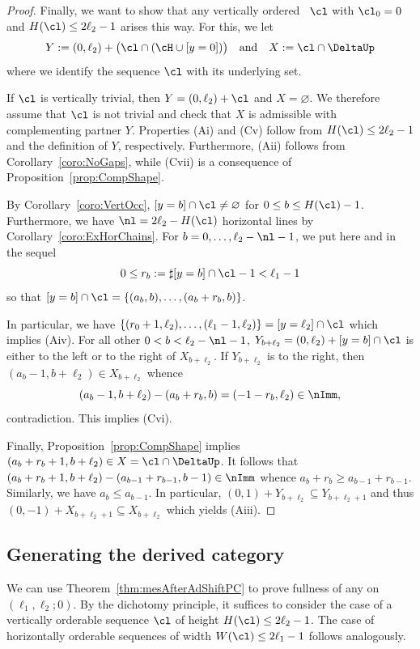 \begin{proof}
Finally, we want to show that any vertically
ordered {\mes}~$\cl$ with $\cl_0=0$ and $H(\cl)
\leq2\ell_2-1$ arises this way. For this, we 
let
$$
Y:=(0,\ell_2)+\big(\cl\cap(\cH\cup[y=0])\big)
\quad\mbox{and}\quad X:=\cl\cap\DeltaUp
$$ 
where we identify the sequence $\cl$ with its
underlying set. 

If $\cl$ is vertically trivial, 
then $Y=(0,\ell_2)+\cl$ and $X=\varnothing$. 
We therefore assume that $\cl$ is not 
trivial and check that $X$ is admissible 
with complementing partner $Y$. Properties 
(Ai) and (Cv) follow from $H(\cl)\leq2\ell_2-1$ 
and the definition of $Y$, respectively. 
Furthermore, (Aii) follows from
Corollary~\ref{coro:NoGaps}, while (Cvii) 
is a consequence of 
Proposition~\ref{prop:CompShape}.

By Corollary~\ref{coro:VertOcc}, 
$[y=b]\cap\cl\not=\varnothing$ for 
$0\leq b\leq H(\cl)-1$. Furthermore,
we have $\nl=2\ell_2-H(\cl)$ horizontal lines 
by Corollary~\ref{coro:ExHorChains}. {For 
$b=0,\ldots,\ell_2-\nl-1$, we put here and in the sequel
\begin{equation}\label{eq:rb}
0\leq r_b:=\sharp[y=b]\cap\cl-1<\ell_1-1
\end{equation}
so that $[y=b]\cap\cl=\{(a_b,b),\ldots,(a_b+r_b,b)\}$.} 

In particular, we have 
$\{(r_0+1,\ell_2),\ldots,(\ell_1-1,\ell_2)\}
=[y=\ell_2]\cap\cl$ which implies (Aiv). 
For all other $0<b<\ell_2-\nl-1$, 
$Y_{b+\ell_2}=(0,\ell_2)+[y=b]\cap\cl$ is either 
to the left or to the right of 
$X_{b+\ell_2}$. If $Y_{b+\ell_2}$ is to the right, 
then $(a_b-1,b+\ell_2)\in X_{b+\ell_2}$ whence 
$$
(a_b-1,b+\ell_2)-(a_b+r_b,b)=
(-1-r_b,\ell_2)\in\nImm,
$$
contradiction. This implies (Cvi).

Finally, Proposition~\ref{prop:CompShape}
implies $(a_b+r_b+1,b+\ell_2)
\in X=\cl\cap\DeltaUp$. It follows that 
$(a_b+r_b+1,b+\ell_2)-(a_{b-1}
+r_{b-1},b-1)\in\nImm$ whence 
$a_b+r_b\geq a_{b-1}+r_{b-1}$. 
Similarly, we have $a_b\leq a_{b-1}$. 
In particular, $(0,1)+Y_{b+\ell_2}
\subseteq Y_{b+\ell_2+1}$
and thus $(0,-1)+X_{b+\ell_2+1}
\subseteq X_{b+\ell_2}$
which yields (Aiii).
\end{proof}

\subsection{Generating the derived category}
\label{subsec:ProofPaPb}

We can use Theorem~\ref{thm:mesAfterAdShiftPC} 
to prove fullness of any {\mes} on 
$(\ell_1,\ell_2;0)$. By the dichotomy {principle}, it 
suffices to consider the case of a vertically 
orderable sequence $\cl$ of height 
$H(\cl)\leq2\ell_2-1$. The case of horizontally
orderable sequences of width $W(\cl)\leq2\ell_1-1$
follows analogously.

